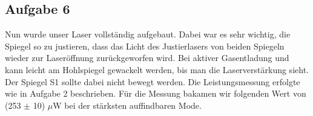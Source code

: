 \subsection{Aufgabe 6}

Nun wurde unser Laser vollständig aufgebaut. Dabei war es sehr wichtig, die Spiegel so zu justieren, dass das Licht des Justierlasers von beiden Spiegeln wieder zur Laseröffnung zurückgeworfen wird. Bei aktiver Gasentladung und kann leicht am Hohlspiegel gewackelt werden, bis man die Laserverstärkung sieht. Der Spiegel S1 sollte dabei nicht bewegt werden. Die Leistungsmessung erfolgte wie in Aufgabe 2 beschrieben.
Für die Messung bakamen wir folgenden Wert von (253 $\pm$ 10) $\mu$W bei der stärksten auffindbaren Mode. 

